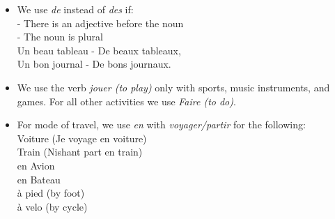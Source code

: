 \begin{itemize}
\item{We use \emph{de} instead of \emph{des} if:\\
- There is an adjective before the noun\\
- The noun is plural\\
Un beau tableau - De beaux tableaux,\\
Un bon journal - De bons journaux.}

\item{We use the verb \emph{jouer (to play)} only with sports, music instruments, and games.
For all other activities we use \emph{Faire (to do)}.}

\item{For mode of travel, we use \emph{en} with \emph{voyager/partir}
for the following:\\
Voiture (Je voyage en voiture)\\
Train (Nishant part en train)\\
en Avion \\
en Bateau \\
\`a pied (by foot) \\
\`a velo (by cycle)}

\end{itemize}


